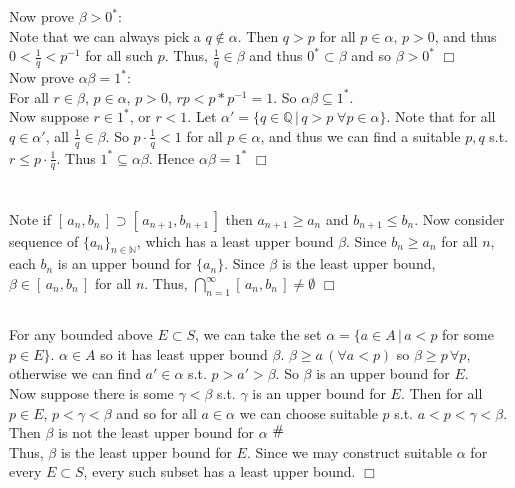 \documentclass{article}
\newcommand{\contra}{\raisebox{\depth}{\#}}
\begin{document}
Now prove $\beta > 0^*$:\\
Note that we can always pick a $q \notin \alpha$. Then $q > p$ for all $p \in \alpha,\, p>0$, and thus $0 < \frac{1}{q} < p^{-1}$ for all such $p$. Thus, $\frac{1}{q} \in\beta$ and thus $0^* \subset \beta$ and so $\beta > 0^*$ $\Box$\\

Now prove $\alpha \beta = 1^*$:\\
For all $r \in \beta$, $p \in \alpha,\,p>0$, $rp < p*p^{-1} = 1$. So $\alpha\beta \subseteq 1^*$.\\
Now suppose $r \in 1^*$, or $r<1$. Let $\alpha' = \{ q \in \mathbb{Q} \,|\, q>p \; \forall p \in \alpha \}$. Note that for all $q \in \alpha'$, all $\frac{1}{q} \in \beta$. So $p\cdot \frac{1}{q} < 1$ for all $p \in \alpha$, and thus we can find a suitable $p,q$ s.t. $r \leq p\cdot\frac{1}{q}$. Thus $1^* \subseteq \alpha\beta$. Hence $\alpha\beta = 1^*$ $\Box$

\section{}
\subsection{}
Note if $[\, a_n,b_n \,] \supset [\, a_{n+1},b_{n+1}\, ]$ then $a_{n+1} \geq a_n$ and $b_{n+1} \leq b_n$. Now consider sequence of $\{a_n\}_{n\in \mathbb{N}}$, which has a least upper bound $\beta$. Since $b_n\geq a_n$ for all $n$, each $b_n$ is an upper bound for $\{a_n\}$. Since $\beta$ is the least upper bound, $\beta \in [\, a_n,b_n\,]$ for all $n$. Thus, $\bigcap_{n=1}^{\infty}[\,a_n,b_n\,] \neq \emptyset $ $\Box$

\subsection{}
For any bounded above $E \subset S$, we can take the set $\alpha = \{ a \in A \,|\, a<p $ for some $p \in E \}$. $\alpha \in A$ so it has least upper bound $\beta$. $\beta \geq a \, (\forall a < p)$ so $\beta \geq p \, \forall p$, otherwise we can find $a' \in \alpha$ s.t. $p > a' > \beta$. So $\beta$ is an upper bound for $E$.\\
Now suppose there is some $\gamma < \beta$ s.t. $\gamma$ is an upper bound for $E$. Then for all $p \in E$, $p < \gamma < \beta$ and so for all $a \in \alpha$ we can choose suitable $p$ s.t. $a < p < \gamma < \beta$. Then $\beta$ is not the least upper bound for $\alpha$ $\contra$\\
Thus, $\beta$ is the least upper bound for $E$. Since we may construct suitable $\alpha$ for every $E \subset S$, every such subset has a least upper bound. $\Box$

\section{}
\end{document}
